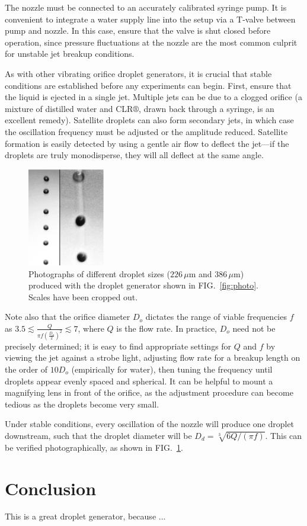 \documentclass[aip,rsi,reprint,graphicx]{revtex4-1} %
\begin{document}
The nozzle must be connected to an accurately calibrated syringe pump. It is
convenient to integrate a water supply line into the setup via a T-valve between
pump and nozzle. In this case, ensure that the valve is shut closed before
operation, since pressure fluctuations at the nozzle are the most common culprit
for unstable jet breakup conditions.

As with other vibrating orifice droplet generators, it is crucial that stable
conditions are established before any experiments can begin. First, ensure that
the liquid is ejected in a single jet. Multiple jets can be due to a clogged
orifice (a mixture of distilled water and CLR$\circledR$, drawn back through a
syringe, is an excellent remedy). Satellite droplets can also form secondary
jets, in which case the oscillation frequency must be adjusted or the amplitude
reduced. Satellite formation is easily detected by using a gentle air flow to
deflect the jet---if the droplets are truly monodisperse, they will all deflect
at the same angle.\cite{Strom69}

\begin{figure}
\centering
\includegraphics[width=0.3\textwidth]{hdg_images/photo.eps}
\caption{Photographs of different droplet sizes ($226\,\mu$m and $386\,\mu$m) produced with the droplet
generator shown in FIG.~\ref{fig:photo}. Scales have been cropped out. \label{fig:dropphoto}}
\end{figure}

Note also that the orifice diameter $D_o$ dictates the range of viable
frequencies $f$ as $3.5 \lesssim \frac{Q}{\pi f \left(\frac{D_o}{2}\right)^2}
\lesssim 7$, where $Q$ is the flow rate. \cite{Savart33, Rayleigh79} In
practice, $D_o$ need not be
precisely determined; it is easy to find appropriate settings for $Q$
and $f$ by viewing the jet against a strobe light, adjusting flow rate for a breakup
length on the order of $10 D_o$ (empirically for water), then tuning the frequency
until droplets appear evenly spaced and spherical. It can be helpful to mount a
magnifying lens in front of the orifice, as the adjustment procedure can become
tedious as the droplets become very small.

Under stable conditions, every oscillation of the nozzle will produce one droplet
downstream,\cite{Rayleigh79} such that the droplet diameter will be $D_d =
\sqrt[3]{6Q/(\pi f)}$. This can be verified photographically, as shown in
FIG.~\ref{fig:dropphoto}.

\section{Conclusion}
This is a great droplet generator, because ...

\end{document}
